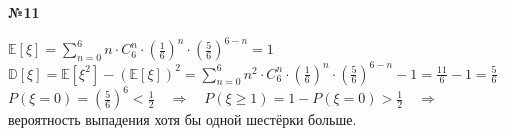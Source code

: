 \documentclass{article}
\newcommand{\rimpl}{\quad\Rightarrow\quad}
\newcommand{\E}[1]{\mathbb{E}[ #1 ]}
\newcommand{\D}[1]{\mathbb{D}[ #1 ]}
\newenvironment{task}{\begin{center}\fontsize{14}{14}\selectfont\bf}{\rm\fontsize{12}{12}\selectfont\end{center}}
\begin{document}
	\begin{task} 
		№11
	\end{task}
	\begin{center}
		$\E{\xi} = \sum\limits_{n = 0}^{6}n\cdot C_6^n\cdot\left(\frac{1}{6}\right)^n\cdot\left(\frac{5}{6}\right)^{6-n} = 1$\\
		$\D{\xi} = \E{\xi^2} - (\E{\xi})^2 = \sum\limits_{n = 0}^{6}n^2\cdot C_6^n\cdot\left(\frac{1}{6}\right)^n\cdot\left(\frac{5}{6}\right)^{6-n} - 1 = \frac{11}{6} - 1 = \frac{5}{6}$ \\
		$P(\xi = 0) = \left(\frac{5}{6}\right)^6 < \frac{1}{2} \rimpl P(\xi \geq 1) = 1 - P(\xi = 0) > \frac{1}{2} \rimpl$ вероятность выпадения хотя бы одной шестёрки больше.
	\end{center}
	
	
	
	
	
	

	
\end{document}
